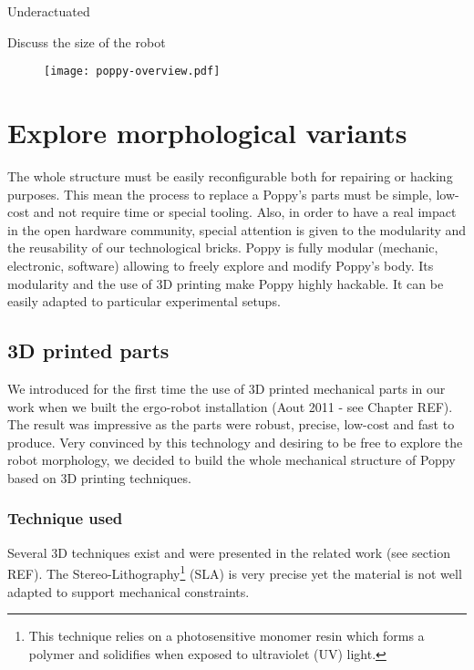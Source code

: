 Underactuated

Discuss the size of the robot

\begin{figure}[tb]
    \begin{center}
        \texttt{[image: poppy-overview.pdf]}
    \end{center}
    \caption{}
    \label{fig:poppyv0.1_overview}
\end{figure}


\section{Explore morphological variants} %

The whole structure must be easily reconfigurable both for repairing or hacking purposes. This mean the process to replace a Poppy's parts must be simple, low-cost and not require time or special tooling. Also, in order to have a real impact in the open hardware community, special attention is given to the modularity and the reusability of our technological bricks.
Poppy is fully modular (mechanic, electronic, software) allowing to freely explore and modify Poppy's body.
Its modularity and the use of 3D printing make Poppy highly hackable. It can be easily adapted to particular experimental setups.


\subsection{3D printed parts} %

We introduced for the first time the use of 3D printed mechanical parts in our work when we built the ergo-robot installation (Aout 2011 - see Chapter REF). The result was impressive as the parts were robust, precise, low-cost and fast to produce. Very convinced by this technology and desiring to be free to explore the robot morphology, we decided to build the whole mechanical structure of Poppy based on 3D printing techniques.

\subsubsection{Technique used} %

Several 3D techniques exist and were presented in the related work (see section REF). The Stereo-Lithography\footnote{This technique relies on a photosensitive monomer resin which forms a polymer and solidifies when exposed to ultraviolet (UV) light.} (SLA) is very precise yet the material is not well adapted to support mechanical constraints.

